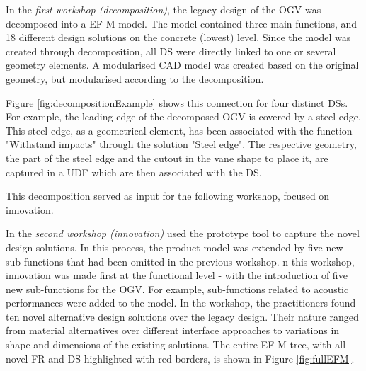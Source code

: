 \documentclass[preprints,article,accept,moreauthors,pdftex]{Definitions/mdpi}
\begin{document}

In the\textit{ first workshop (decomposition)}, the legacy design of the \ac{OGV} was decomposed into a \ac{EF-M} model.
The model contained three main functions, and 18 different design solutions on the concrete (lowest) level.
Since the model was created through decomposition, all \ac{DS} were directly linked to one or several geometry elements.
A modularised CAD model was created based on the original geometry, but modularised according to the decomposition.


Figure \ref{fig:decompositionExample} shows this connection for four distinct DSs.
For example, the leading edge of the decomposed \ac{OGV} is covered by a steel edge.
This steel edge, as a geometrical element, has been associated with the function "Withstand impacts" through the solution "Steel edge".
The respective geometry, the part of the steel edge and the cutout in the vane shape to place it, are captured in a UDF which are then associated with the DS.

This decomposition served as input for the following workshop, focused on innovation. 


In the \textit{second workshop (innovation)} used the prototype tool to capture the novel design solutions.
In this process, the product model was extended by five new sub-functions that had been omitted in the previous workshop.
n this workshop, innovation was made first at the functional level - with the introduction of five new sub-functions for the OGV. For example,  sub-functions related to acoustic performances were added to the model. 
In the workshop, the practitioners found ten novel alternative  design solutions over the legacy design.
Their nature ranged from material alternatives over different interface approaches to variations in shape and dimensions of the existing solutions.
The entire EF-M tree, with all novel FR and DS highlighted with red borders, is shown in Figure \ref{fig:fullEFM}.
\end{document}
